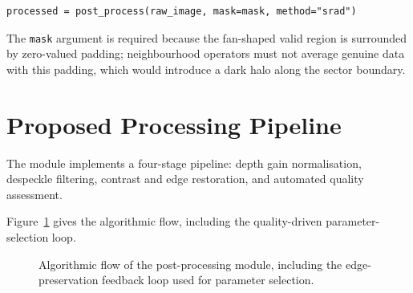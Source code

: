 \documentclass[12pt,a4paper,oneside]{report}
\begin{document}
\begin{lstlisting}[caption={Public interface of the Post Image Processing module.},
                   label={lst:api}]
processed = post_process(raw_image, mask=mask, method="srad")
\end{lstlisting}

The \texttt{mask} argument is required because the fan-shaped valid region is
surrounded by zero-valued padding; neighbourhood operators must not average
genuine data with this padding, which would introduce a dark halo along the sector
boundary.

\section{Proposed Processing Pipeline}

The module implements a four-stage pipeline: depth gain normalisation, despeckle
filtering, contrast and edge restoration, and automated quality assessment.


Figure~\ref{fig:flowchart} gives the algorithmic flow, including the
quality-driven parameter-selection loop.

\begin{figure}[!htbp]
\centering
{}
\caption{Algorithmic flow of the post-processing module, including the
edge-preservation feedback loop used for parameter selection.}
\label{fig:flowchart}
\end{figure}
\end{document}
